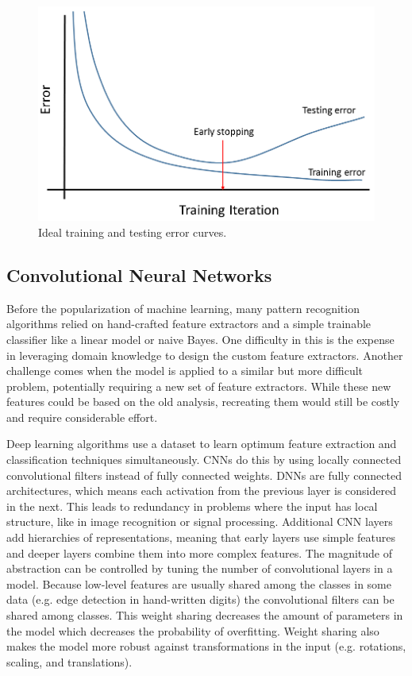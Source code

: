 \begin{figure}[H]
	\centering
	\includegraphics[width=0.85\linewidth]{images/training_testing_error_v2}
	\caption{Ideal training and testing error curves.}
	\label{fig:training_testing_error}
\end{figure}

\subsection{Convolutional Neural Networks}

Before the popularization of machine learning, many pattern recognition algorithms relied on hand-crafted feature extractors and a simple trainable classifier like a linear model or naive Bayes. One difficulty in this is the expense in leveraging domain knowledge to design the custom feature extractors. Another challenge comes when the model is applied to a similar but more difficult problem, potentially requiring a new set of feature extractors. While these new features could be based on the old analysis, recreating them would still be costly and require considerable effort.

Deep learning algorithms use a dataset to learn optimum feature extraction and classification techniques simultaneously. CNNs do this by using locally connected convolutional filters instead of fully connected weights. DNNs are fully connected architectures, which means each activation from the previous layer is considered in the next. This leads to redundancy in problems where the input has local structure, like in image recognition or signal processing. Additional CNN layers add hierarchies of representations, meaning that early layers use simple features and deeper layers combine them into more complex features. The magnitude of abstraction can be controlled by tuning the number of convolutional layers in a model. Because low-level features are usually shared among the classes in some data (e.g. edge detection in hand-written digits) the convolutional filters can be shared among classes. This weight sharing decreases the amount of parameters in the model which decreases the probability of overfitting. Weight sharing also makes the model more robust against transformations in the input (e.g. rotations, scaling, and translations).

